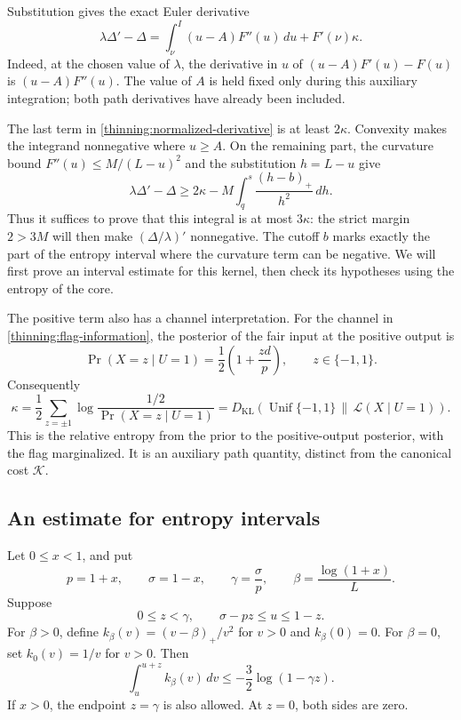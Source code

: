 Substitution gives the exact Euler derivative
\begin{equation}
\label{thinning:normalized-derivative}
 \lambda\Delta'-\Delta
 =\int_\nu^I(u-A)F''(u)\,du+F'(\nu)\kappa.
\end{equation}
Indeed, at the chosen value of $\lambda$, the derivative in $u$
of $(u-A)F'(u)-F(u)$ is $(u-A)F''(u)$. The value of $A$ is
held fixed only during this auxiliary integration; both path
derivatives have already been included.

The last term in \eqref{thinning:normalized-derivative} is at least
$2\kappa$. Convexity makes the integrand nonnegative where $u\ge A$.
On the remaining part, the curvature bound
$F''(u)\le M/(L-u)^2$ and the substitution $h=L-u$ give
\begin{equation}
\label{thinning:derivative-loss}
 \lambda\Delta'-\Delta
 \ge2\kappa-M\int_q^s\frac{(h-b)_+}{h^2}\,dh.
\end{equation}
Thus it suffices to prove that this integral is at most $3\kappa$:
the strict margin $2>3M$ will then make
$(\Delta/\lambda)'$ nonnegative. The cutoff $b$ marks exactly
the part of the entropy interval where the curvature term can be
negative. We will first prove an interval estimate for this kernel,
then check its hypotheses using the entropy of the core.

The positive term also has a channel interpretation. For the channel
in \eqref{thinning:flag-information}, the posterior of the fair input
at the positive output is
\[
 \Pr(X=z\mid U=1)=\frac12\left(1+\frac{zd}{p}\right),
 \qquad z\in\{-1,1\}.
\]
Consequently
\[
 \kappa=\frac12\sum_{z=\pm1}
 \log\frac{1/2}{\Pr(X=z\mid U=1)}
 =D_{\mathrm{KL}}\!\left(
 \operatorname{Unif}\{-1,1\}\,\middle\|\,
 \mathcal L(X\mid U=1)\right).
\]
This is the relative entropy from the prior to the positive-output
posterior, with the flag marginalized. It is an auxiliary path
quantity, distinct from the canonical cost $\mathcal K$.

\subsection{An estimate for entropy intervals}

\begin{lemma}
\label{thinning:interval}
Let $0\le x<1$, and put
\[
 p=1+x,\qquad \sigma=1-x,\qquad
 \gamma=\frac{\sigma}{p},\qquad
 \beta=\frac{\log(1+x)}L.
\]
Suppose
\[
 0\le z<\gamma,\qquad \sigma-pz\le u\le1-z.
\]
For $\beta>0$, define $k_\beta(v)=(v-\beta)_+/v^2$ for $v>0$
and $k_\beta(0)=0$.  For $\beta=0$, set $k_0(v)=1/v$ for $v>0$.
Then
\begin{equation}
\label{thinning:interval-bound}
 \int_u^{u+z}k_\beta(v)\,dv
 \le-\frac32\log(1-\gamma z).
\end{equation}
If $x>0$, the endpoint $z=\gamma$ is also allowed.  At $z=0$,
both sides are zero.
\end{lemma}


